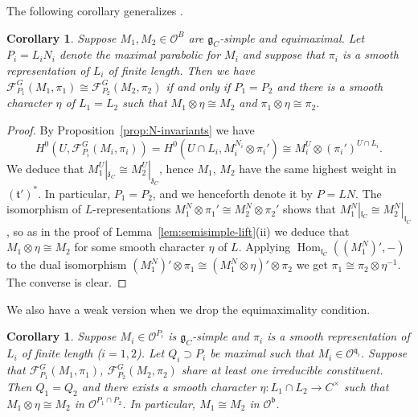 \documentclass[a4paper]{amsart}
\numberwithin{equation}{section}
\newtheorem{cor}[thm]{Corollary}
\theoremstyle{remark}
\theoremstyle{definition}
\DeclareMathOperator{\Hom}{Hom}
\begin{document}
The following corollary generalizes \cite[Corollary 2.7]{socle1}.

\begin{cor}\label{cor:F-P-G-intertwiner}
  Suppose $M_1, M_2 \in \mathcal{O}^{B}$ are $\mathfrak{g}_{C}$-simple and equimaximal. Let $P_i = L_i N_i$ denote the maximal parabolic for $M_i$ and suppose that
  $\pi_i$ is a smooth representation of $L_i$ of finite length. Then we have $\mathcal{F}_{P_1}^G(M_1,\pi_1) \cong \mathcal{F}_{P_2}^G(M_2,\pi_2)$
  if and only if $P_1 = P_2$ and there is a smooth character $\eta$ of $L_1 = L_2$ such that $M_1 \otimes \eta \cong M_2$ and $\pi_1 \otimes \eta \cong \pi_2$.
\end{cor}

\begin{proof}
  By Proposition~\ref{prop:N-invariants} we have
  \begin{equation*}
    H^0(U,\mathcal{F}_{P_i}^G(M_i,\pi_i)) = H^0(U \cap L_i, M_i^{N_i} \otimes \pi_i') \cong M_i^U \otimes (\pi_i')^{U \cap L_i}.
  \end{equation*}
  We deduce that $M_1^U|_{\mathfrak{z}_C} \cong M_2^U|_{\mathfrak{z}_C}$, hence $M_1$, $M_2$ have the same highest weight in $(\mathfrak{t}')^*$.
  In particular, $P_1 = P_2$, and we henceforth denote it by $P = LN$.
  The isomorphism of $L$-representations $M_1^{N} \otimes \pi_1'\cong M_2^{N} \otimes \pi_2'$ shows that
  $M_1^N|_{\mathfrak{l}_{C}} \cong M_2^N|_{\mathfrak{l}_{C}}$, so as in the proof of Lemma~\ref{lem:semisimple-lift}(ii) we deduce that $M_1 \otimes \eta \cong M_2$ 
  for some smooth character $\eta$ of $L$.
  Applying $\Hom_{\mathfrak{l}_{C}}((M_1^{N})',-)$ to the dual isomorphism $(M_1^{N})' \otimes \pi_1\cong (M_1^{N} \otimes \eta)' \otimes \pi_2$ we get $\pi_1 \cong \pi_2 \otimes \eta^{-1}$.
  The converse is clear.
\end{proof}

We also have a weak version when we drop the equimaximality condition.

\begin{cor}\label{cor:F-P-G-intertwiner2}
  Suppose $M_i \in \mathcal{O}^{P_i}$ is $\mathfrak{g}_{C}$-simple and $\pi_i$ is a smooth representation of $L_i$ of finite length ($i = 1,2$).
  Let $Q_i \supset P_i$ be maximal such that $M_i \in \mathcal{O}^{\mathfrak q_i}$.
  Suppose that $\mathcal{F}_{P_1}^G(M_1,\pi_1)$, $\mathcal{F}_{P_2}^G(M_2,\pi_2)$ share at least one irreducible constituent.
  Then $Q_1 = Q_2$ and there exists a smooth character $\eta \colon L_1 \cap L_2 \to C^\times$ such that $M_1 \otimes \eta \cong M_2$ in $\mathcal O^{P_1 \cap P_2}$.
  In particular, $M_1 \cong M_2$ in $\mathcal O^{\mathfrak b}$.
\end{cor}
\end{document}
